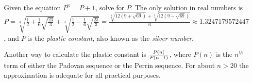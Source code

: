 \documentclass[12pt]{article}
\begin{document}
Given the equation $P^3 = P + 1$, solve for $P$. The only solution in real numbers is $P = \sqrt[3]{\frac{1}{2}+\frac{1}{6}\sqrt{\frac{23}{3}}}+\sqrt[3]{\frac{1}{2}-\frac{1}{6}\sqrt{\frac{23}{3}}} = \frac{\sqrt[3]{12(9+\sqrt{69})}+\sqrt[3]{12(9-\sqrt{69})}}{6} \approx 1.3247179572447$, and $P$ is the \emph{plastic constant}, also known as the \emph{silver number}.

Another way to calculate the plastic constant is ${{P(n)} \over {P(n - 1)}}$, where $P(n)$ is the $n^{th}$ term of either the Padovan sequence or the Perrin sequence. For about $n > 20$ the approximation is adequate for all practical purposes.

\end{document}
